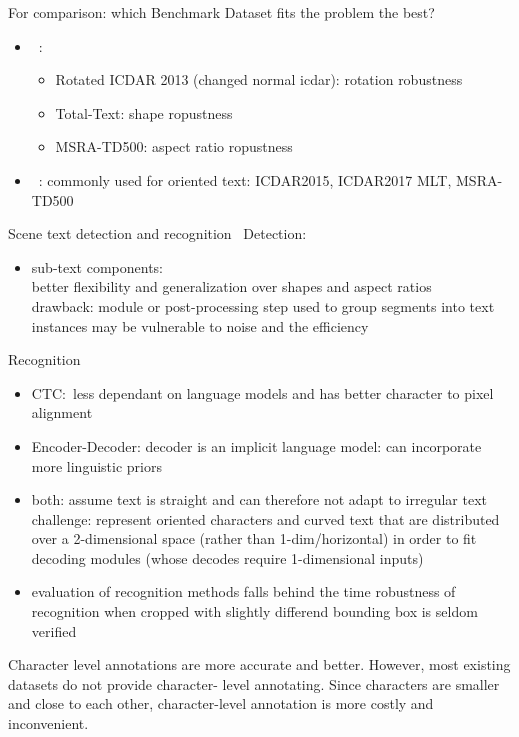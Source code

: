 For comparison: which Benchmark Dataset fits the problem the best?
\begin{itemize}
    \item~\cite{liao_mask_2020}:
        \begin{itemize}
            \item Rotated ICDAR 2013 (changed normal icdar): rotation robustness
            \item Total-Text: shape ropustness
            \item MSRA-TD500: aspect ratio ropustness
        \end{itemize}
    \item~\cite{yang_learning_2021}: commonly used for oriented text: ICDAR2015, ICDAR2017 MLT,
        MSRA-TD500
\end{itemize}

Scene text detection and recognition~\cite{long_scene_2021}
Detection:
\begin{itemize}
    \item sub-text components: \\
        better flexibility and generalization over shapes and aspect ratios\\
        drawback: module or post-processing step used to group segments into text instances
        may be vulnerable to noise and the efficiency
\end{itemize}
Recognition
\begin{itemize}
    \item CTC:\ less dependant on language models and has better character to pixel alignment
    \item Encoder-Decoder: decoder is an implicit language model: can incorporate more linguistic priors
    \item both: assume text is straight and can therefore not adapt to irregular text
        challenge: represent oriented characters and curved text that are distributed over a
        2-dimensional space
            (rather than 1-dim/horizontal) in order to fit decoding modules (whose decodes require
            1-dimensional inputs)
        \item evaluation of recognition methods falls behind the time robustness of recognition when
            cropped with slightly differend bounding box is seldom verified
\end{itemize}
Character level annotations are more accurate and better. However, most existing datasets do not
provide character- level annotating. Since characters are smaller and close to each other,
character-level annotation is more costly and inconvenient.

